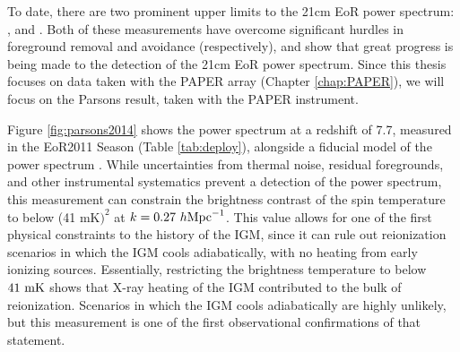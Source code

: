 To date, there are two prominent upper limits to the 21cm EoR power spectrum: \citet{Parsons2014},
and \citet{Paciga2013}. Both of these measurements have overcome significant hurdles in foreground
removal and avoidance (respectively), and show that great progress is being made to the detection of
the 21cm EoR power spectrum. Since this thesis focuses on data taken with the PAPER array (Chapter
\ref{chap:PAPER}), we will focus on the Parsons result, taken with the PAPER instrument.

Figure \ref{fig:parsons2014} shows the power spectrum at a redshift of 7.7, measured in the EoR2011 Season 
(Table \ref{tab:deploy}), alongside a fiducial model of the power spectrum \cite{Lidz2008}. While
uncertainties from thermal noise, residual foregrounds, and other instrumental systematics prevent a
detection of the power spectrum, this measurement can constrain the brightness contrast of the spin
temperature to below (41 mK$)^2$ at $k = 0.27\ h{\rm Mpc}^{-1}$. This value allows for one of the
first physical constraints to the history of the IGM, since it can rule out reionization scenarios
in which the IGM cools adiabatically, with no heating from early ionizing sources. Essentially,
restricting the brightness temperature to below $41\ {\rm mK}$ shows that X-ray heating of the IGM
contributed to the bulk of reionization. Scenarios in which the IGM cools adiabatically are highly
unlikely, but this measurement is one of the first observational confirmations of that statement.
